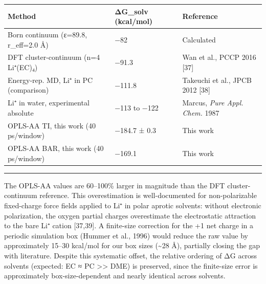 \documentclass[
  11pt,
]{article}
\newcounter{none} %
\begin{document}
{\def\LTcaptype{none} %
\begin{longtable}[]{@{}
  >{\raggedright\arraybackslash}p{}
  >{\raggedright\arraybackslash}p{}
  >{\raggedright\arraybackslash}p{}@{}}
\toprule\noalign{}
\begin{minipage}[b]{\linewidth}\raggedright
Method
\end{minipage} & \begin{minipage}[b]{\linewidth}\raggedright
ΔG\_solv (kcal/mol)
\end{minipage} & \begin{minipage}[b]{\linewidth}\raggedright
Reference
\end{minipage} \\
\midrule\noalign{}
\endhead
\bottomrule\noalign{}
\endlastfoot
Born continuum (ε=89.8, r\_eff=2.0 Å) & −82 & Calculated \\
DFT cluster-continuum (n=4 Li⁺(EC)₄) & −91.3 & Wan et al., PCCP 2016
{[}37{]} \\
Energy-rep. MD, Li⁺ in PC (comparison) & −111.8 & Takeuchi et al., JPCB
2012 {[}38{]} \\
Li⁺ in water, experimental absolute & −113 to −122 & Marcus, \emph{Pure
Appl. Chem.} 1987 \\
OPLS-AA TI, this work (40 ps/window) & −184.7 ± 0.3 & This work \\
OPLS-AA BAR, this work (40 ps/window) & −169.1 & This work \\
\end{longtable}
}

\begin{center}\rule{0.5\linewidth}{0.5pt}\end{center}

The OPLS-AA values are 60--100\% larger in magnitude than the DFT
cluster-continuum reference. This overestimation is well-documented for
non-polarizable fixed-charge force fields applied to Li⁺ in polar
aprotic solvents: without electronic polarization, the oxygen partial
charges overestimate the electrostatic attraction to the bare Li⁺ cation
{[}37,39{]}. A finite-size correction for the +1 net charge in a
periodic simulation box (Hummer et al., 1996) would reduce the raw value
by approximately 15--30 kcal/mol for our box sizes (\textasciitilde28
Å), partially closing the gap with literature. Despite this systematic
offset, the relative ordering of ΔG across solvents (expected: EC ≈ PC
\textgreater\textgreater{} DME) is preserved, since the finite-size
error is approximately box-size-dependent and nearly identical across
solvents.
\end{document}
